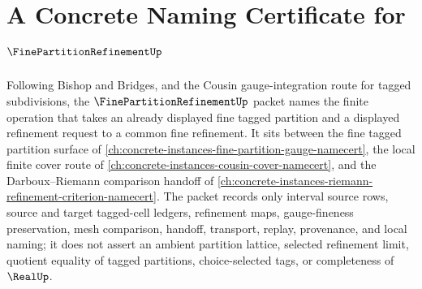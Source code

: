 \chapter{A Concrete Naming Certificate for $\FinePartitionRefinementUp$}
\label{ch:concrete-instances-fine-partition-refinement-namecert}

Following Bishop and Bridges, and the Cousin gauge-integration route for tagged subdivisions, the $\FinePartitionRefinementUp$ packet names the finite operation that takes an already displayed fine tagged partition and a displayed refinement request to a common fine refinement. It sits between the fine tagged partition surface of \autoref{ch:concrete-instances-fine-partition-gauge-namecert}, the local finite cover route of \autoref{ch:concrete-instances-cousin-cover-namecert}, and the Darboux--Riemann comparison handoff of \autoref{ch:concrete-instances-riemann-refinement-criterion-namecert}. The packet records only interval source rows, source and target tagged-cell ledgers, refinement maps, gauge-fineness preservation, mesh comparison, handoff, transport, replay, provenance, and local naming; it does not assert an ambient partition lattice, selected refinement limit, quotient equality of tagged partitions, choice-selected tags, or completeness of $\RealUp$.

